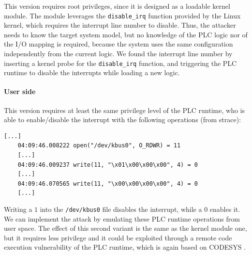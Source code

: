 This version requires root privileges, since it is designed as a loadable kernel module.
The module leverages the \verb|disable_irq| function provided by the Linux kernel, which requires the interrupt line number to disable.
Thus, the attacker needs to know the target system model, but no knowledge of the PLC logic nor of the I/O mapping is required, because the system uses the same
configuration independently from the current logic.
We found the interrupt line number by inserting a kernel probe for the \verb|disable_irq| function, and triggering the PLC runtime to disable the interrupts
while loading a new logic.


\paragraph{User side}

This version requires at least the same privilege level of the PLC runtime, who is able to enable/disable the interrupt with the following operations (from strace):
\begin{Verbatim}[fontsize=\small]
	[...]
	04:09:46.008222 open("/dev/kbus0", O_RDWR) = 11
	[...]
	04:09:46.009237 write(11, "\x01\x00\x00\x00", 4) = 0
	[...]
	04:09:46.070565 write(11, "\x00\x00\x00\x00", 4) = 0
	[...]
\end{Verbatim}
Writing a $1$ into the \verb|/dev/kbus0| file disables the interrupt, while a $0$ enables it. We can implement the attack by emulating these PLC runtime operations from user space.
The effect of this second variant is the same as the kernel module one, but it requires less privilege and it could be exploited through a
remote code execution vulnerability of the PLC runtime, which is again based on CODESYS \cite{abb-codesys,codesys-server}.
